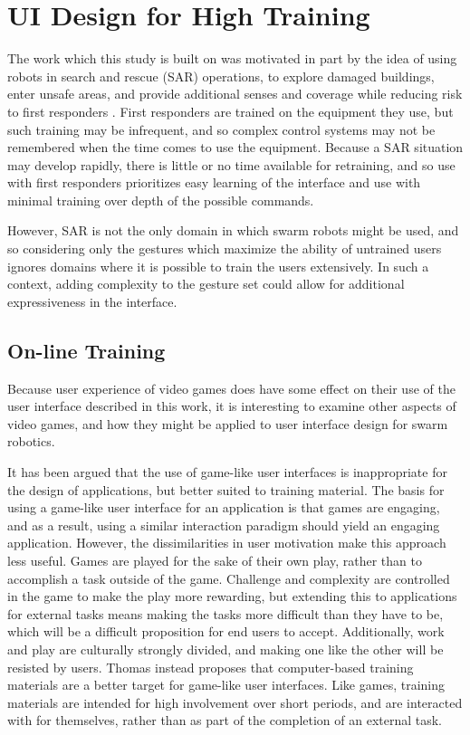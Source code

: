 \chapter{UI Design for High Training}
\thispagestyle{fancy}

The work which this study is built on was motivated in part by the idea of using robots in search and rescue (SAR) operations, to explore damaged buildings, enter unsafe areas, and provide additional senses and coverage while reducing risk to first responders \citep{micire2010multi}.
First responders are trained on the equipment they use, but such training may be infrequent, and so complex control systems may not be remembered when the time comes to use the equipment. 
Because a SAR situation may develop rapidly, there is little or no time available for retraining, and so use with first responders prioritizes easy learning of the interface and use with minimal training over depth of the possible commands.  

However, SAR is not the only domain in which swarm robots might be used, and so considering only the gestures which maximize the ability of untrained users ignores domains where it is possible to train the users extensively. 
In such a context, adding complexity to the gesture set could allow for additional expressiveness in the interface.

\section{On-line Training}

Because user experience of video games does have some effect on their use of the user interface described in this work, it is interesting to examine other aspects of video games, and how they might be applied to user interface design for swarm robotics. 

It has been argued that the use of game-like user interfaces is inappropriate for the design of applications, but better suited to training material\citep{thomas1994games}. The basis for using a game-like user interface for an application is that games are engaging, and as a result, using a similar interaction paradigm should yield an engaging application. 
However, the dissimilarities in user motivation make this approach less useful. 
Games are played for the sake of their own play, rather than to accomplish a task outside of the game. 
Challenge and complexity are controlled in the game to make the play more rewarding, but extending this to applications for external tasks means making the tasks more difficult than they have to be, which will be a difficult proposition for end users to accept. 
Additionally, work and play are culturally strongly divided, and making one like the other will be resisted by users. 
Thomas instead proposes that computer-based training materials are a better target for game-like user interfaces. 
Like games, training materials are intended for high involvement over short periods, and are interacted with for themselves, rather than as part of the completion of an external task. 

